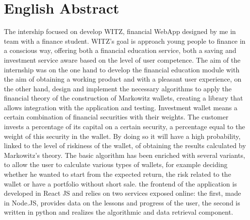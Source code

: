 \chapter*{English Abstract}

The intership focused on develop WITZ, financial WebApp designed by me in team with a finance student.
WITZ's goal is approach young people to finance in a conscious way, offering both a 
financial education service, both a saving and investment service aware based on the level of user competence.
The aim of the internship was on the one hand to develop the financial education module with the aim of obtaining a working product and with a pleasant user experience, on the other hand, design and implement the necessary algorithms to apply the financial theory of the construction of Markowitz wallets, creating a library that allows integration with the application and testing.
Investment wallet means a certain combination of financial securities with their weights. The customer invests a percentage of its capital on a certain security, a percentage equal to the weight of this security in the wallet. By doing so it will have a high probability, linked to the level of riskiness of the wallet, of obtaining the results calculated by Markowitz’s theory.
The basic algorithm has been enriched with several variants, to allow the user to calculate various types of wallets, for example deciding whether he wanted to start from the expected return, the risk related to the wallet or have a portfolio without short sale.
the frontend of the application is developed in React JS and relies on two services exposed online: the first, made in Node.JS, provides data on the lessons and progress of the user, the second is written in python and realizes the algorithmic and data retrieval component.